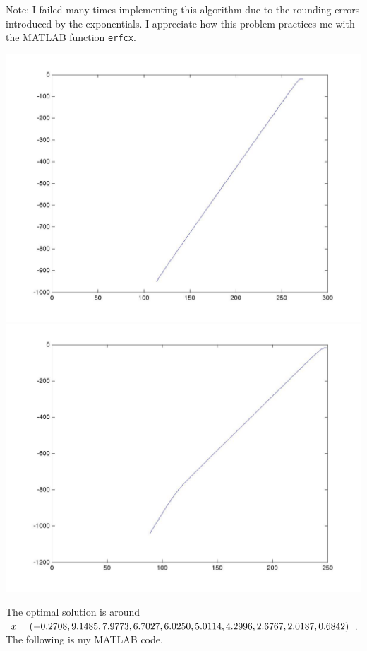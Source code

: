 \documentclass[12pt,a4paper]{article}
\begin{document}
Note: I failed many times implementing this algorithm due to the rounding errors introduced by the exponentials. I appreciate how this problem practices me with the MATLAB function \texttt{erfcx}.
\begin{center}
\includegraphics[scale=0.2]{hw9P89.jpg}
\includegraphics[scale=0.2]{hw9P89-2.jpg}
\end{center}
The optimal solution is around 
\newcommand{\splitatcommas}[1]{%
  \begingroup
  \begingroup\lccode`~=`, \lowercase{\endgroup
    \edef~{\mathchar\the\mathcode`, \penalty0 \noexpand\hspace{0pt plus 1em}}%
  }\mathcode`,="8000 #1%
  \endgroup
}
$x = (\splitatcommas{-0.2708,9.1485,7.9773,6.7027,6.0250,5.0114,4.2996,2.6767,2.0187,0.6842})$. The following is my MATLAB code.
\end{document}
